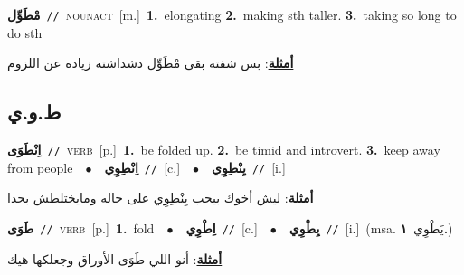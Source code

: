 \documentclass[10pt,a4paper,twoside]{article} %
\begin{document}
\begin{multicols}{2}
{\setlength\topsep{0pt}\textbf{\foreignlanguage{arabic}{مْطَوِّل}}\ {\color{gray}\texttt{//}\color{black}}\ \textsc{noun\textunderscore act}\ [m.]\ \textbf{1.}~elongating  \textbf{2.}~making sth taller.  \textbf{3.}~taking so long to do sth\  \begin{flushright}\color{gray}\foreignlanguage{arabic}{\textbf{\underline{\foreignlanguage{arabic}{أمثلة}}}: بس شفته بقى مْطَوِّل دشداشته  زياده عن اللزوم}\end{flushright}\color{black}} \vspace{2mm}

\vspace{-3mm}
\subsection*{\color{blue}\foreignlanguage{arabic}{ط.و.ي}\color{blue}{}} 

{\setlength\topsep{0pt}\textbf{\foreignlanguage{arabic}{اِنْطَوَى}}\ {\color{gray}\texttt{//}\color{black}}\ \textsc{verb}\ [p.]\ \textbf{1.}~be folded up.  \textbf{2.}~be timid and introvert.  \textbf{3.}~keep away from people\ \ $\bullet$\ \ \setlength\topsep{0pt}\textbf{\foreignlanguage{arabic}{اِنْطِوِي}}\ {\color{gray}\texttt{//}\color{black}}\ [c.]\ \ $\bullet$\ \ \setlength\topsep{0pt}\textbf{\foreignlanguage{arabic}{يِنْطِوِي}}\ {\color{gray}\texttt{//}\color{black}}\ [i.]\  \begin{flushright}\color{gray}\foreignlanguage{arabic}{\textbf{\underline{\foreignlanguage{arabic}{أمثلة}}}: ليش أخوك بيحب يِنْطِوِي على حاله ومايختلطش بحدا}\end{flushright}\color{black}} \vspace{2mm}

{\setlength\topsep{0pt}\textbf{\foreignlanguage{arabic}{طَوَى}}\ {\color{gray}\texttt{//}\color{black}}\ \textsc{verb}\ [p.]\ \textbf{1.}~fold\ \ $\bullet$\ \ \setlength\topsep{0pt}\textbf{\foreignlanguage{arabic}{اِطْوِي}}\ {\color{gray}\texttt{//}\color{black}}\ [c.]\ \ $\bullet$\ \ \setlength\topsep{0pt}\textbf{\foreignlanguage{arabic}{يِطْوِي}}\ {\color{gray}\texttt{//}\color{black}}\ [i.]\ \color{gray}(msa. \foreignlanguage{arabic}{يَطْوِي}~\foreignlanguage{arabic}{\textbf{١.}})\color{black}\  \begin{flushright}\color{gray}\foreignlanguage{arabic}{\textbf{\underline{\foreignlanguage{arabic}{أمثلة}}}: أنو اللي طَوَى الأوراق وجعلكها هيك}\end{flushright}\color{black}} \vspace{2mm}


\end{multicols}
\end{document}
